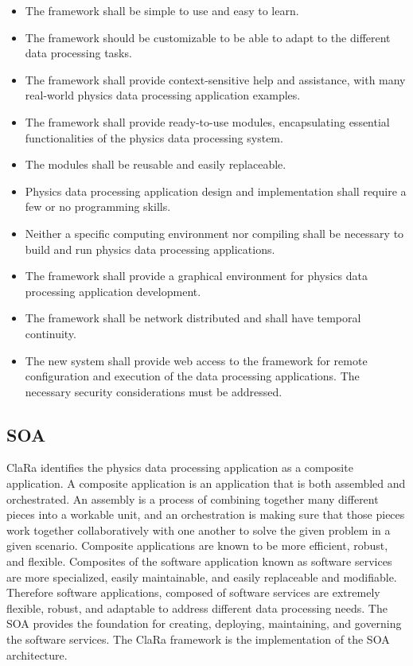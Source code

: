 \begin{itemize}
\item The framework shall be simple to use and easy to learn.
\item The framework should be customizable to be able to adapt to the 
different data processing tasks.
\item The framework shall provide context-sensitive help and assistance, with 
many real-world physics data processing application examples.
\item The framework shall provide ready-to-use modules, encapsulating 
essential functionalities of the physics data processing system.
\item The modules shall be reusable and easily replaceable.
\item Physics data processing application design and implementation shall 
require a few or no programming skills.
\item Neither a specific computing environment nor compiling shall be 
necessary to build and run physics data processing applications.
\item The framework shall provide a graphical environment for physics data 
processing application development.
\item The framework shall be network distributed and shall have temporal 
continuity.
\item The new system shall provide web access to the framework for remote 
configuration and execution of the data processing applications. The 
necessary security considerations must be addressed. 
\end{itemize}

\subsection{SOA}

ClaRa identifies the physics data processing application as a composite 
application. A composite application is an application that is both assembled 
and orchestrated. An assembly is a process of combining together many 
different pieces into a workable unit, and an orchestration is making sure 
that those pieces work together collaboratively with one another to solve the 
given problem in a given scenario. Composite applications are known to be more 
efficient, robust, and flexible. Composites of the software application known 
as software services are more specialized, easily maintainable, and easily 
replaceable and modifiable. Therefore software applications, composed of 
software services are extremely flexible, robust, and adaptable to address 
different data processing needs. The SOA provides the foundation for 
creating, deploying, maintaining, and governing the software services. The 
ClaRa framework is the implementation of the SOA architecture.

